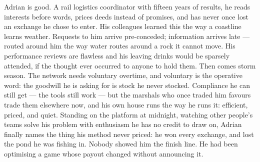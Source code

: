 

\begin{story}
Adrian is good. A rail logistics coordinator with fifteen years of results, he reads interests before words, prices deeds instead of promises, and has never once lost an exchange he chose to enter. His colleagues learned this the way a coastline learns weather. Requests to him arrive pre-conceded; information arrives late --- routed around him the way water routes around a rock it cannot move. His performance reviews are flawless and his leaving drinks would be sparsely attended, if the thought ever occurred to anyone to hold them. Then comes storm season. The network needs voluntary overtime, and voluntary is the operative word: the goodwill he is asking for is stock he never stocked. Compliance he can still get --- the tools still work --- but the marshals who once traded him favours trade them elsewhere now, and his own house runs the way he runs it: efficient, priced, and quiet. Standing on the platform at midnight, watching other people's teams solve his problem with enthusiasm he has no credit to draw on, Adrian finally names the thing his method never priced: he won every exchange, and lost the pond he was fishing in. Nobody showed him the finish line. He had been optimising a game whose payout changed without announcing it.
\end{story}

